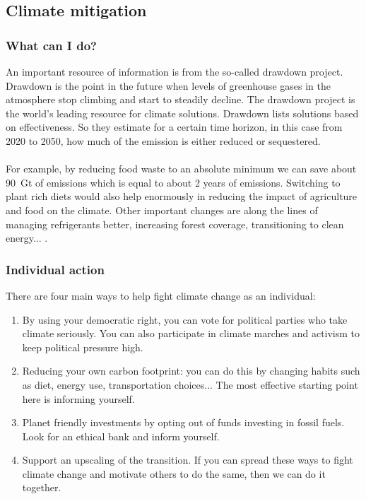 \documentclass[../summary.tex]{subfiles}
\begin{document}
\subsection{Climate mitigation}
\subsubsection{What can I do?}
An important resource of information is from the so-called drawdown project. Drawdown is the point in the future when levels of greenhouse gases in the atmosphere stop climbing and start to steadily decline. The drawdown project is the world's leading resource for climate solutions. Drawdown lists solutions based on effectiveness. So they estimate for a certain time horizon, in this case from 2020 to 2050, how much of the emission is either reduced or sequestered.
\\\\
For example, by reducing food waste to an absolute minimum we can save about \SI{90}{\giga\tonne} of emissions which is equal to about 2 years of emissions. Switching to plant rich diets would also help enormously in reducing the impact of agriculture and food on the climate. Other important changes are along the lines of managing refrigerants better, increasing forest coverage, transitioning to clean energy... .

\subsubsection{Individual action}
There are four main ways to help fight climate change as an individual:
\begin{enumerate}
	\item By using your democratic right, you can vote for political parties who take climate seriously. You can also participate in climate marches and activism to keep political pressure high.
	\item Reducing your own carbon footprint: you can do this by changing habits such as diet, energy use, transportation choices... The most effective starting point here is informing yourself.
	\item Planet friendly investments by opting out of funds investing in fossil fuels. Look for an ethical bank and inform yourself.
	\item Support an upscaling of the transition. If you can spread these ways to fight climate change and motivate others to do the same, then we can do it together.
\end{enumerate}
\end{document}
